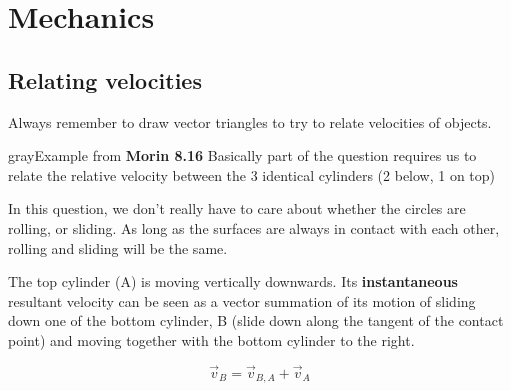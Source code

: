 \chapter{Mechanics}
\section{Relating velocities}
Always remember to draw vector triangles to try to relate velocities of objects.
\begin{mybox}{gray}{Example from \textbf{Morin 8.16}}
    Basically part of the question requires us to relate the relative velocity between the 3 identical cylinders (2 below, 1 on top)
    \begin{flushleft}
        In this question, we don't really have to care about whether the circles are rolling, or sliding. As long as the surfaces are always in contact with each other, rolling and sliding will be the same.
    \end{flushleft}
    \begin{flushleft}
        The top cylinder (A) is moving vertically downwards. Its \textbf{instantaneous} resultant velocity can be seen as a vector summation of its motion of sliding down one of the bottom cylinder, B (slide down along the tangent of the contact point) and moving together with the bottom cylinder to the right.
    \end{flushleft}
    \begin{equation}
        \vec{v}_B=\vec{v}_{B,A}+\vec{v}_A
    \end{equation}
\end{mybox}

